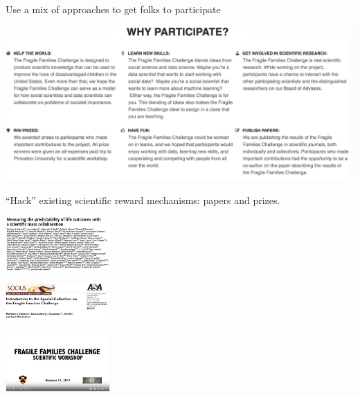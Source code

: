 \documentclass[aspectratio=169]{beamer}
\begin{document}
\begin{frame}

Use a mix of approaches to get folks to participate

\begin{center}
\includegraphics[width=\textwidth]{figures/ffc_why_participate}
\end{center}

\end{frame}
\begin{frame}

``Hack'' existing scientific reward mechanisms: papers and prizes.\\

\begin{center}
\includegraphics[width=0.3\textwidth]{figures/salganik_measuring_2020_title_authors}
\end{center}

\pause

\begin{center}
\includegraphics[width=0.3\textwidth]{figures/salganik_introduction_2019_title}
\end{center}

\pause

\begin{center}
\includegraphics[width=0.3\textwidth]{figures/ffc_scientific_workshop}
\end{center}

\end{frame}
\end{document}
